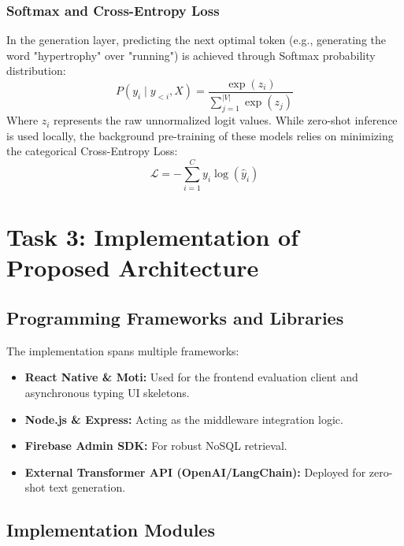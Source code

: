 \documentclass[12pt, a4paper]{report}
\begin{document}
\subsection{Softmax and Cross-Entropy Loss}
In the generation layer, predicting the next optimal token (e.g., generating the word "hypertrophy" over "running") is achieved through Softmax probability distribution:
\begin{equation}
P(y_i \mid y_{<i}, X) = \frac{\exp(z_i)}{\sum_{j=1}^{|V|} \exp(z_j)}
\end{equation}
Where $z_i$ represents the raw unnormalized logit values. While zero-shot inference is used locally, the background pre-training of these models relies on minimizing the categorical Cross-Entropy Loss:
\begin{equation}
\mathcal{L} = - \sum_{i=1}^{C} y_i \log(\hat{y}_i)
\end{equation}


\chapter{Task 3: Implementation of Proposed Architecture}

\section{Programming Frameworks and Libraries}
The implementation spans multiple frameworks:
\begin{itemize}
    \item \textbf{React Native \& Moti:} Used for the frontend evaluation client and asynchronous typing UI skeletons.
    \item \textbf{Node.js \& Express:} Acting as the middleware integration logic.
    \item \textbf{Firebase Admin SDK:} For robust NoSQL retrieval.
    \item \textbf{External Transformer API (OpenAI/LangChain):} Deployed for zero-shot text generation.
\end{itemize}

\section{Implementation Modules}
\end{document}
